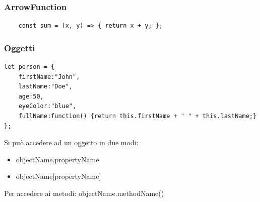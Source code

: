 \subsubsection{ArrowFunction}
\begin{lstlisting}
    const sum = (x, y) => { return x + y; };
\end{lstlisting}
\subsubsection{Oggetti}
\begin{lstlisting}
let person = {
    firstName:"John",
    lastName:"Doe",
    age:50,
    eyeColor:"blue",
    fullName:function() {return this.firstName + " " + this.lastName;}
};
\end{lstlisting}
Si può accedere ad un oggetto in due modi:
\begin{itemize}
    \item objectName.propertyName
    \item objectName[propertyName]
\end{itemize}
Per accedere ai metodi: objectName.methodName()


